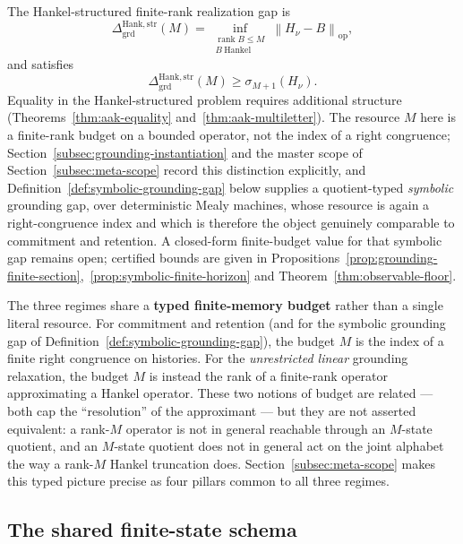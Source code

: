 \documentclass[12pt]{article}
\theoremstyle{definition}
\newcommand{\norm}[1]{\left\lVert#1\right\rVert}
\newcommand{\DHankstr}{\Delta_{\mathrm{grd}}^{\mathrm{Hank,str}}}
\begin{document}
\begin{enumerate}[label=(\arabic*),leftmargin=2.2em]
The Hankel-structured finite-rank realization gap is
\[
\DHankstr(M)
=
\inf_{\substack{
\operatorname{rank}B\le M\\
B\ \text{Hankel}
}}
\norm{H_\nu-B}_{\mathrm{op}},
\]
and satisfies
\[
\DHankstr(M)
\ge
\sigma_{M+1}(H_\nu).
\]
Equality in the Hankel-structured problem requires additional structure
(Theorems~\ref{thm:aak-equality} and~\ref{thm:aak-multiletter}).  The
resource $M$ here is a finite-rank budget on a bounded operator, not the
index of a right congruence; Section~\ref{subsec:grounding-instantiation} and
the master scope of Section~\ref{subsec:meta-scope} record this distinction
explicitly, and Definition~\ref{def:symbolic-grounding-gap} below supplies a
quotient-typed \emph{symbolic} grounding gap, over deterministic Mealy
machines, whose resource is again a right-congruence index and which is
therefore the object genuinely comparable to commitment and retention.  A
closed-form finite-budget value for that symbolic gap remains open; certified
bounds are given in
Propositions~\ref{prop:grounding-finite-section},~\ref{prop:symbolic-finite-horizon}
and Theorem~\ref{thm:observable-floor}.
\end{enumerate}

The three regimes share a \textbf{typed finite-memory budget} rather than a
single literal resource.  For commitment and retention (and for the symbolic
grounding gap of Definition~\ref{def:symbolic-grounding-gap}), the budget $M$
is the index of a finite right congruence on histories.  For the
\emph{unrestricted linear} grounding relaxation, the budget $M$ is instead the
rank of a finite-rank operator approximating a Hankel operator.  These two
notions of budget are related --- both cap the ``resolution'' of the
approximant --- but they are not asserted equivalent: a rank-$M$ operator is
not in general reachable through an $M$-state quotient, and an $M$-state
quotient does not in general act on the joint alphabet the way a rank-$M$
Hankel truncation does.  Section~\ref{subsec:meta-scope} makes this typed
picture precise as four pillars common to all three regimes.

\subsection{The shared finite-state schema}
\label{subsec:shared-schema-intro}
\end{document}
